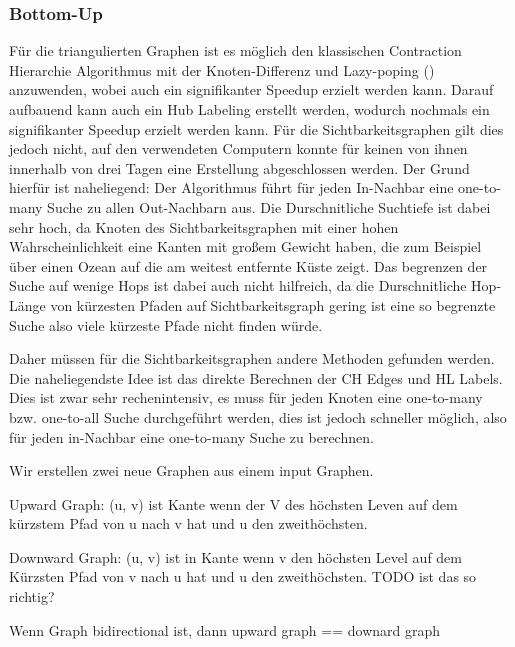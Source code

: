 \subsubsection{Bottom-Up}


\clearpage


Für die triangulierten Graphen ist es möglich den klassischen Contraction Hierarchie Algorithmus mit der Knoten-Differenz und Lazy-poping (\cite{geisberger2008contraction}) anzuwenden, wobei auch ein signifikanter Speedup erzielt werden kann. 
Darauf aufbauend kann auch ein Hub Labeling erstellt werden, wodurch nochmals ein signifikanter Speedup erzielt werden kann.
Für die Sichtbarkeitsgraphen gilt dies jedoch nicht, auf den verwendeten Computern konnte für keinen von ihnen innerhalb von drei Tagen eine Erstellung abgeschlossen werden.
Der Grund hierfür ist naheliegend: Der Algorithmus führt für jeden In-Nachbar eine one-to-many Suche zu allen Out-Nachbarn aus.
Die Durschnitliche Suchtiefe ist dabei sehr hoch, da Knoten des Sichtbarkeitsgraphen mit einer hohen Wahrscheinlichkeit eine Kanten mit großem Gewicht haben, die zum Beispiel über einen Ozean auf die am weitest entfernte Küste zeigt.
Das begrenzen der Suche auf wenige Hops ist dabei auch nicht hilfreich, da die Durschnitliche Hop-Länge von kürzesten Pfaden auf Sichtbarkeitsgraph gering ist eine so begrenzte Suche also viele kürzeste Pfade nicht finden würde.

Daher müssen für die Sichtbarkeitsgraphen andere Methoden gefunden werden.
Die naheliegendste Idee ist das direkte Berechnen der CH Edges und HL Labels.
Dies ist zwar sehr rechenintensiv, es muss für jeden Knoten eine one-to-many bzw. one-to-all Suche durchgeführt werden, dies ist jedoch schneller möglich, also für jeden in-Nachbar eine one-to-many Suche zu berechnen.



Wir erstellen zwei neue Graphen aus einem input Graphen.

Upward Graph: (u, v) ist Kante wenn der V des höchsten Leven auf dem kürzstem Pfad von u nach v hat und u den zweithöchsten.

Downward Graph: (u, v) ist in Kante wenn v den höchsten Level auf dem Kürzsten Pfad von v nach u hat und u den zweithöchsten.
TODO ist das so richtig?

Wenn Graph bidirectional ist, dann upward graph == downard graph

